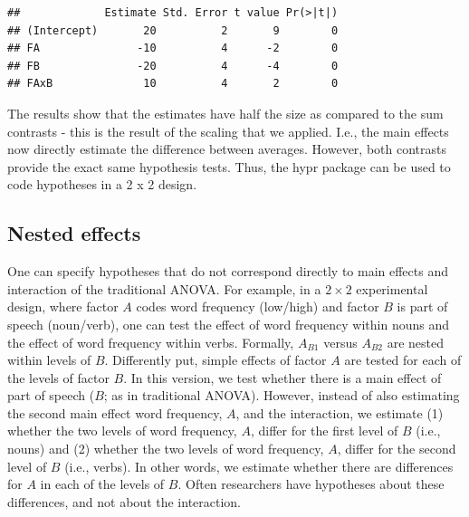 \documentclass[
  12pt,
]{krantz}
\newenvironment{Shaded}{\begin{snugshade}}{\end{snugshade}}
\newcommand{\FunctionTok}[1]{\textcolor[rgb]{0.00,0.00,0.00}{#1}}
\newcommand{\NormalTok}[1]{#1}
\newcommand{\SpecialCharTok}[1]{\textcolor[rgb]{0.00,0.00,0.00}{#1}}
\theoremstyle{definition}
\theoremstyle{definition}
\theoremstyle{definition}
\theoremstyle{definition}
\theoremstyle{remark}
\begin{document}
\begin{Shaded}
\end{Shaded}

\begin{verbatim}
##             Estimate Std. Error t value Pr(>|t|)
## (Intercept)       20          2       9        0
## FA               -10          4      -2        0
## FB               -20          4      -4        0
## FAxB              10          4       2        0
\end{verbatim}

The results show that the estimates have half the size as compared to the sum contrasts - this is the result of the scaling that we applied. I.e., the main effects now directly estimate the difference between averages. However, both contrasts provide the exact same hypothesis tests. Thus, the hypr package can be used to code hypotheses in a 2 x 2 design.

\hypertarget{nestedEffects}{%
\subsection{Nested effects}\label{nestedEffects}}

One can specify hypotheses that do not correspond directly to main effects and interaction of the traditional ANOVA. For example, in a \(2 \times 2\) experimental design, where factor \(A\) codes word frequency (low/high) and factor \(B\) is part of speech (noun/verb), one can test the effect of word frequency within nouns and the effect of word frequency within verbs. Formally, \(A_{B1}\) versus \(A_{B2}\) are nested within levels of \(B\). Differently put, simple effects of factor \(A\) are tested for each of the levels of factor \(B\).
In this version, we test whether there is a main effect of part of speech (\(B\); as in traditional ANOVA). However, instead of also estimating the second main effect word frequency, \(A\), and the interaction, we estimate (1) whether the two levels of word frequency, \(A\), differ for the first level of \(B\) (i.e., nouns) and (2) whether the two levels of word frequency, \(A\), differ for the second level of \(B\) (i.e., verbs). In other words, we estimate whether there are differences for \(A\) in each of the levels of \(B\). Often researchers have hypotheses about these differences, and not about the interaction.
\end{document}

